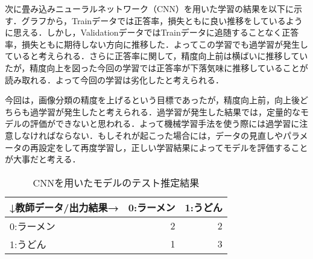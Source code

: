 \documentclass[uplatex,titlepage]{jsarticle}
\newif\iffigure
\begin{document}
次に畳み込みニューラルネットワーク（CNN）を用いた学習の結果を以下に示す．グラフから，Trainデータでは正答率，損失ともに良い推移をしているように思える．しかし，ValidationデータではTrainデータに追随することなく正答率，損失ともに期待しない方向に推移した．よってこの学習でも過学習が発生していると考えられる．さらに正答率に関して，精度向上前は横ばいに推移していたが，精度向上を図った今回の学習では正答率が下落気味に推移していることが読み取れる．よって今回の学習は劣化したと考えられる．\par
今回は，画像分類の精度を上げるという目標であったが，精度向上前，向上後どちらも過学習が発生したと考えられる．過学習が発生した結果では，定量的なモデルの評価ができないと思われる．よって機械学習手法を使う際には過学習に注意しなければならない．もしそれが起こった場合には，データの見直しやパラメータの再設定をして再度学習し，正しい学習結果によってモデルを評価することが大事だと考える．
\iffigure
\begin{figure}[H]
\begin{minipage}{8cm}%
  \begin{center}
   \texttt{[image: ker\_CNN\_acc.png]} \\
   \caption{CNNを用いたモデルの正答率の推移}
  \end{center}
\end{minipage}
\hfill
\begin{minipage}{8cm}%
  \begin{center}
    \texttt{[image: ker\_CNN\_loss.png]} \\
    \caption{CNNを用いたモデルの損失の推移}
  \end{center}
\end{minipage}
\end{figure}
\fi
\begin{table}[H]
  \begin{center}
    \caption{CNNを用いたモデルのテスト推定結果}
    \begin{tabular}[t]{|l|r|r|}
    \hline
    ↓教師データ/出力結果→ & 0:ラーメン & 1:うどん \\ \hline \hline
    0:ラーメン & 2 & 2 \\ \hline
    1:うどん & 1 & 3 \\ \hline
    \end{tabular}
  \end{center}
\end{table}
\end{document}
